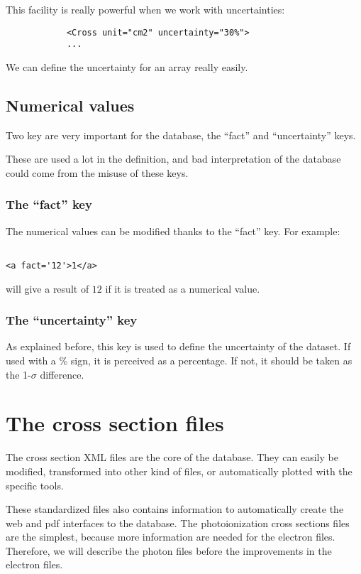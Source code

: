 This facility is really powerful when we work with uncertainties:
\begin{verbatim}
			<Cross unit="cm2" uncertainty="30%">
			...
\end{verbatim}
We can define the uncertainty for an array really easily. 


\subsection{Numerical values}

Two key are very important for the database, the ``fact'' and ``uncertainty'' keys.

These are used a lot in the definition, and bad interpretation of the database could come from the misuse of these keys.

\subsubsection{The ``fact'' key}
The numerical values can be modified thanks to the ``fact'' key.
For example:
\begin{verbatim}

<a fact='12'>1</a>
\end{verbatim}
will give a result of $12$ if it is treated as a numerical value.
\subsubsection{The ``uncertainty'' key}

As explained before, this key is used to define the uncertainty of the dataset. If used with a \% sign, it is perceived as a percentage. If not, it should be taken as the 1-$\sigma$  difference.


\section{The  cross section files}

The cross section XML files are the core of the database. They can easily be modified, transformed into other kind of files, or automatically plotted with the specific tools.

These standardized files also contains information to automatically create the web and pdf interfaces to the database. The photoionization cross sections files are the simplest, because more information are needed for the electron files. Therefore, we will describe the photon files before the improvements in the electron files.

